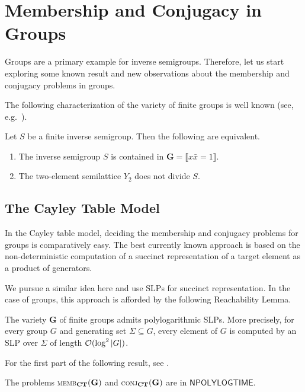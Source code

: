 \documentclass[anonymous,letter,UKenglish,cleveref,autoref,thm-restate]{lipics-v2021}
\newcommand{\eg}{e.g.~}
\newcommand{\abs}[1] {\ensuremath\left|#1\right|}
\newcommand{\NPOLYLOGTIME}{\ensuremath{\mathsf{NPOLYLOGTIME}}\xspace}
\newcommand{\vG}{\ensuremath{\mathbf{G}}}
\newcommand{\vId}[1]{\ensuremath{\llbracket #1 \rrbracket}}
\theoremstyle{plain}
\theoremstyle{plain}
\newcommand{\dMemb}[2][]{\textup{\textsc{memb${}_{\mathbf{#1}}\expandafter\ifx\expandafter\relax\detokenize{#2}\relax\else(#2)\fi$}}}
\newcommand{\dConj}[2][]{\textup{\textsc{conj${}_{\mathbf{#1}}\expandafter\ifx\expandafter\relax\detokenize{#2}\relax\else(#2)\fi$}}}
\begin{document}
\section{Membership and Conjugacy in Groups}\label{sec:groups}

Groups are a primary example for inverse semigroups.
Therefore, let us start exploring some known result and new observations about the membership and conjugacy problems in groups.

The following characterization of the variety of finite groups is well known (see, \eg \cite{HallJohnston89}).

\begin{lemma}\label{lem:characterization-groups}
  Let $S$ be a finite inverse semigroup.
  Then the following are equivalent.
  \begin{enumerate}
    \item The inverse semigroup $S$ is contained in $\vG = \vId{x \bar x = 1}$.
    \item The two-element semilattice $Y_2$ does not divide $S$.
  \end{enumerate}
\end{lemma}


\subsection{The Cayley Table Model}

In the Cayley table model, deciding the membership and conjugacy problems for groups is comparatively easy.
The best currently known approach \cite{CollinsGLW24arxiv} is based on the non-deterministic computation of a succinct representation of a target element as a product of generators.

We pursue a similar idea here and use SLPs for succinct representation.
In the case of groups, this approach is afforded by the following Reachability Lemma.

\begin{lemma}\label{lem:groups-slp}
	The variety $\vG$ of finite groups admits polylogarithmic SLPs.
	More precisely, for every group $G$ and generating set $\Sigma \subseteq G$, every element of $G$ is computed by an SLP over $\Sigma$ of length $\mathcal{O}(\log^2 \abs{G})$.
\end{lemma}
For the first part of the following result, see \cite{Fleischer19diss}.
\begin{proposition}\label{pro:ctm-groups}
  The problems \dMemb[CT]{\vG} and \dConj[CT]{\vG} are in \NPOLYLOGTIME{}.
\end{proposition}
\end{document}
